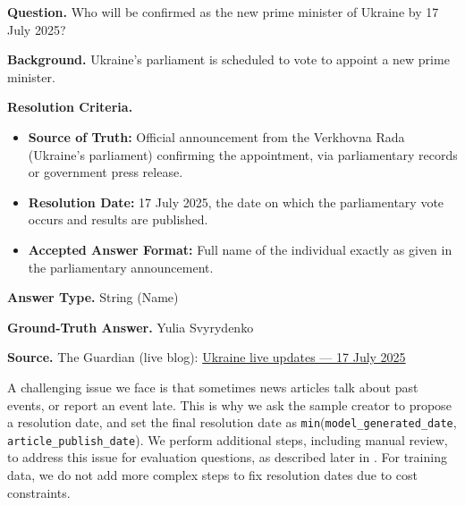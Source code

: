 \documentclass{article} %
\begin{document}
\begin{tcolorbox}[title=\textbf{Sample Generated Forecasting Question}, colframe=black!70, colback=black!2, boxrule=0.5pt, breakable]
\textbf{Question.} Who will be confirmed as the new prime minister of Ukraine by 17 July 2025?

\medskip
\textbf{Background.}
Ukraine's parliament is scheduled to vote to appoint a new prime minister.

\medskip
\textbf{Resolution Criteria.}
\begin{itemize}[leftmargin=1.1em, itemsep=0.2em]
  \item \textbf{Source of Truth:} Official announcement from the Verkhovna Rada (Ukraine's parliament) confirming the appointment, via parliamentary records or government press release.
  \item \textbf{Resolution Date:} 17 July 2025, the date on which the parliamentary vote occurs and results are published.
  \item \textbf{Accepted Answer Format:} Full name of the individual exactly as given in the parliamentary announcement.
\end{itemize}

\medskip
\textbf{Answer Type.} String (Name)

\medskip
\textbf{Ground-Truth Answer.} Yulia Svyrydenko

\medskip
\textbf{Source.} The Guardian (live blog): \href{https://www.theguardian.com/world/live/2025/jul/17/ukraine-russia-war-patriot-nato-latest-europe-news-live-updates}{Ukraine live updates --- 17 July 2025}
\end{tcolorbox} \vspace{0.15cm}

 A challenging issue we face is that sometimes news articles talk about past events, or report an event late. This is why we ask the sample creator to propose a resolution date, and set the final resolution date as \texttt{min}\big(\texttt{model\_generated\_date}, \texttt{article\_publish\_date}\big). We perform additional steps, including manual review, to address this issue for evaluation questions, as described later in . For training data, we do not add more complex steps to fix resolution dates due to cost constraints. \vspace{0.15cm}
\end{document}
